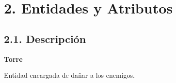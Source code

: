 \documentclass{article}
\begin{document}

\cleardoublepage


\section{2. Entidades y Atributos}

\subsection{2.1. Descripción}

\noindent \textbf{Torre}

\hfill \break \noindent Entidad encargada de dañar a los enemigos.
\end{document}
